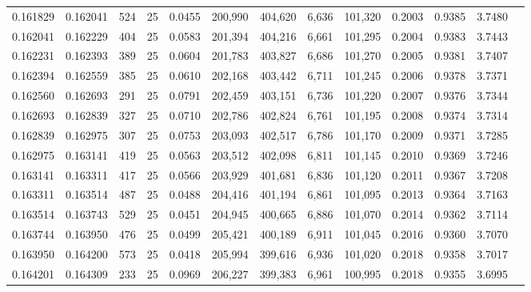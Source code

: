 \begin{tabular}{rrrrrrrrrrrrr}
0.161829 & 0.162041 &   524 &  25 &                                     0.0455 & 200,990 & 404,620 &   6,636 & 101,320 & 0.2003 & 0.9385 & 3.7480 \\
0.162041 & 0.162229 &   404 &  25 &                                     0.0583 & 201,394 & 404,216 &   6,661 & 101,295 & 0.2004 & 0.9383 & 3.7443 \\
0.162231 & 0.162393 &   389 &  25 &                                     0.0604 & 201,783 & 403,827 &   6,686 & 101,270 & 0.2005 & 0.9381 & 3.7407 \\
0.162394 & 0.162559 &   385 &  25 &                                     0.0610 & 202,168 & 403,442 &   6,711 & 101,245 & 0.2006 & 0.9378 & 3.7371 \\
0.162560 & 0.162693 &   291 &  25 &                                     0.0791 & 202,459 & 403,151 &   6,736 & 101,220 & 0.2007 & 0.9376 & 3.7344 \\
0.162693 & 0.162839 &   327 &  25 &                                     0.0710 & 202,786 & 402,824 &   6,761 & 101,195 & 0.2008 & 0.9374 & 3.7314 \\
0.162839 & 0.162975 &   307 &  25 &                                     0.0753 & 203,093 & 402,517 &   6,786 & 101,170 & 0.2009 & 0.9371 & 3.7285 \\
0.162975 & 0.163141 &   419 &  25 &                                     0.0563 & 203,512 & 402,098 &   6,811 & 101,145 & 0.2010 & 0.9369 & 3.7246 \\
0.163141 & 0.163311 &   417 &  25 &                                     0.0566 & 203,929 & 401,681 &   6,836 & 101,120 & 0.2011 & 0.9367 & 3.7208 \\
0.163311 & 0.163514 &   487 &  25 &                                     0.0488 & 204,416 & 401,194 &   6,861 & 101,095 & 0.2013 & 0.9364 & 3.7163 \\
0.163514 & 0.163743 &   529 &  25 &                                     0.0451 & 204,945 & 400,665 &   6,886 & 101,070 & 0.2014 & 0.9362 & 3.7114 \\
0.163744 & 0.163950 &   476 &  25 &                                     0.0499 & 205,421 & 400,189 &   6,911 & 101,045 & 0.2016 & 0.9360 & 3.7070 \\
0.163950 & 0.164200 &   573 &  25 &                                     0.0418 & 205,994 & 399,616 &   6,936 & 101,020 & 0.2018 & 0.9358 & 3.7017 \\
0.164201 & 0.164309 &   233 &  25 &                                     0.0969 & 206,227 & 399,383 &   6,961 & 100,995 & 0.2018 & 0.9355 & 3.6995 \\

\end{tabular}
